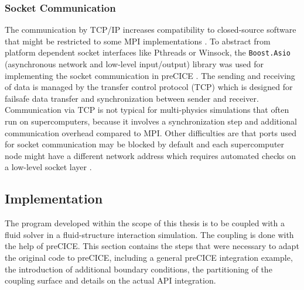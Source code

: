   \subsubsection{Socket Communication}\label{sec:Coupl-Communication-TCP}
   The communication by TCP/IP increases compatibility to closed-source software that might be restricted to some MPI implementations \cite{bungartz2015fully}. To abstract from platform dependent socket interfaces like Pthreads or Winsock, the \texttt{Boost.Asio} (asynchronous network and low-level input/output) library was used for implementing the socket communication in preCICE \cite{gatzhammer2015efficient}. The sending and receiving of data is managed by the transfer control protocol (TCP) which is designed for failsafe data transfer and synchronization between sender and receiver. Communication via TCP is not typical for multi-physics simulations that often run on supercomputers, because it involves a synchronization step and additional communication overhead compared to MPI. Other difficulties are that ports used for socket communication may be blocked by default and each supercomputer node might have a different network address which requires automated checks on a low-level socket layer \cite{gatzhammer2015efficient}.


 \subsection{Implementation}\label{sec:Coupl-Impl}
  The program developed within the scope of this thesis is to be coupled with a fluid solver in a fluid-structure interaction simulation. The coupling is done with the help of preCICE. This section contains the steps that were necessary to adapt the original code to preCICE, including a general preCICE integration example, the introduction of additional boundary conditions, the partitioning of the coupling surface and details on the actual API integration.
  
  
